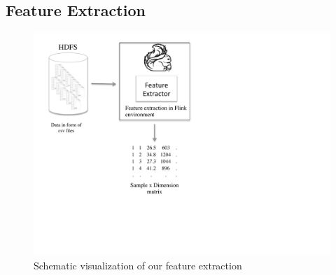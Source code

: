 \documentclass{vldb}
\begin{document}
\subsection{Feature Extraction}
\label{subsec:Metho-feature}

\begin{figure}
\centering
\includegraphics[trim=1cm 4cm 8cm 0.5cm, clip=true, width=\linewidth]{"pics/approach1"}
\caption{Schematic visualization of our feature extraction}
\label{fig:approach-1}
\end{figure}
\end{document}

